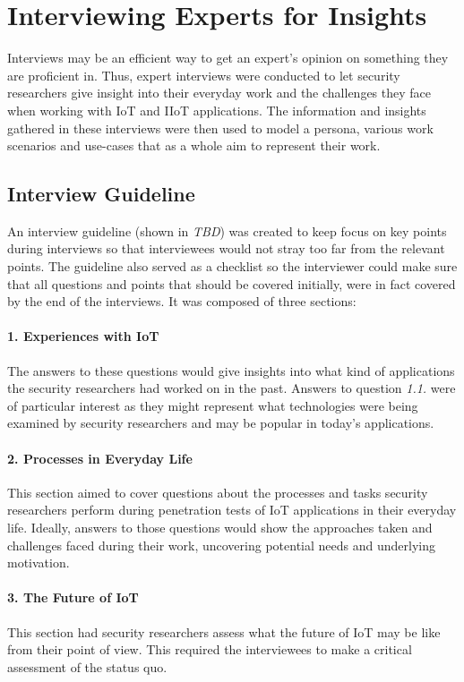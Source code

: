\section{Interviewing Experts for Insights}
\label{sec:interviews}
Interviews may be an efficient way to get an expert’s opinion on something they are proficient in. Thus, expert interviews were conducted to let security researchers give insight into their everyday work and the challenges they face when working with \ac{IoT} and \ac{IIoT} applications. The information and insights gathered in these interviews were then used to model a persona, various work scenarios and use-cases that as a whole aim to represent their work.

\subsection{Interview Guideline}
An interview guideline (shown in \emph{TBD}) %
was created to keep focus on key points during interviews so that interviewees would not stray too far from the relevant points. The guideline also served as a checklist so the interviewer could make sure that all questions and points that should be covered  initially, were in fact covered by the end of the interviews. It was composed of three sections:

\paragraph{1. Experiences with IoT} The answers to these questions would give insights into what kind of applications the security researchers had worked on in the past. Answers to question \emph{1.1.} were of particular interest as they might represent what technologies were being examined by security researchers and may be popular in today’s applications.
\paragraph{2. Processes in Everyday Life} This section aimed to cover questions about the processes and tasks security researchers perform during penetration tests of IoT applications in their everyday life. Ideally, answers to those questions would show the approaches taken and challenges faced during their work, uncovering potential needs and underlying motivation.
\paragraph{3. The Future of IoT} This section had security researchers assess what the future of IoT may be like from their point of view. This required the interviewees to make a critical assessment of the status quo.


